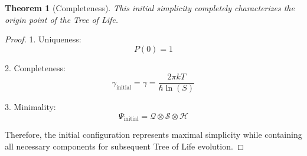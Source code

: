 \documentclass{article}
\newtheorem{theorem}{Theorem}
\begin{document}
\begin{theorem}[Completeness]
This initial simplicity completely characterizes the origin point of the Tree of Life.
\end{theorem}

\begin{proof}
1. Uniqueness:
   \begin{equation}
   P(0) = 1
   \end{equation}

2. Completeness:
   \begin{equation}
   γ_{\text{initial}} = γ = \frac{2πkT}{ℏ \ln(S)}
   \end{equation}

3. Minimality:
   \begin{equation}
   \Psi_{\text{initial}} = \mathcal{Q} \otimes \mathcal{S} \otimes \mathcal{H}
   \end{equation}

Therefore, the initial configuration represents maximal simplicity while containing all necessary components for subsequent Tree of Life evolution.
\end{proof}
\end{document}
